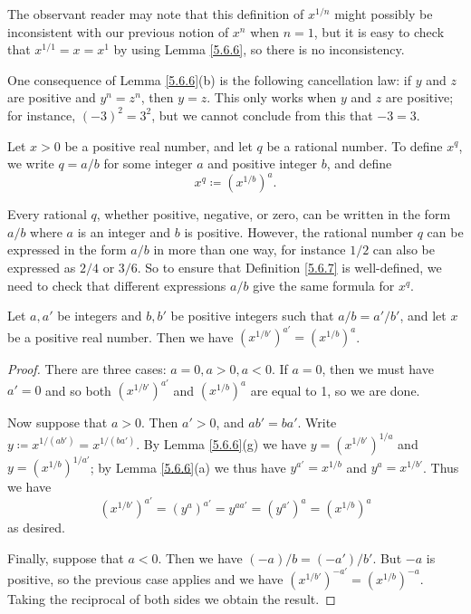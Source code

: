 \begin{note}
    The observant reader may note that this definition of \(x^{1 / n}\) might possibly be inconsistent with our previous notion of \(x^n\) when \(n = 1\), but it is easy to check that \(x^{1 / 1} = x = x^1\) by using Lemma \ref{5.6.6}, so there is no inconsistency.
\end{note}

\begin{note}
    One consequence of Lemma \ref{5.6.6}(b) is the following cancellation law:
    if \(y\) and \(z\) are positive and \(y^n = z^n\), then \(y = z\).
    This only works when \(y\) and \(z\) are positive;
    for instance, \((-3)^2 = 3^2\), but we cannot conclude from this that \(-3 = 3\).
\end{note}

\begin{definition}\label{5.6.7}
    Let \(x > 0\) be a positive real number, and let \(q\) be a rational number.
    To define \(x^q\), we write \(q = a / b\) for some integer \(a\) and positive integer \(b\), and define
    \[
        x^q \coloneqq (x^{1 / b})^a.
    \]
\end{definition}

\begin{note}
    Every rational \(q\), whether positive, negative, or zero, can be written in the form \(a / b\) where \(a\) is an integer and \(b\) is positive.
    However, the rational number \(q\) can be expressed in the form \(a / b\) in more than one way, for instance \(1 / 2\) can also be expressed as \(2 / 4\) or \(3 / 6\).
    So to ensure that Definition \ref{5.6.7} is well-defined, we need to check that different expressions \(a / b\) give the same formula for \(x^q\).
\end{note}

\begin{lemma}\label{5.6.8}
    Let \(a, a'\) be integers and \(b, b'\) be positive integers such that \(a / b = a' / b'\), and let \(x\) be a positive real number.
    Then we have \((x^{1 / b'})^{a'} = (x^{1 / b})^a\).
\end{lemma}

\begin{proof}
    There are three cases: \(a = 0, a > 0, a < 0\).
    If \(a = 0\), then we must have \(a' = 0\) and so both \((x^{1 / b'})^{a'}\) and \((x^{1 / b})^a\) are equal to 1, so we are done.

    Now suppose that \(a > 0\).
    Then \(a' > 0\), and \(ab' = ba'\).
    Write \(y \coloneqq x^{1 / (ab')} = x^{1 / (ba')}\).
    By Lemma \ref{5.6.6}(g) we have \(y = (x^{1 / b'})^{1 / a}\) and \(y = (x^{1 / b})^{1 / a'}\);
    by Lemma \ref{5.6.6}(a) we thus have \(y^{a'} = x^{1 / b}\) and \(y^a = x^{1 / b'}\).
    Thus we have
    \[
        (x^{1 / b'})^{a'} = (y^a)^{a'} = y^{aa'} = (y^{a'})^a = (x^{1 / b})^a
    \]
    as desired.

    Finally, suppose that \(a < 0\).
    Then we have \((-a) / b = (-a') / b'\).
    But \(-a\) is positive, so the previous case applies and we have \((x^{1 / b'})^{-a'} = (x^{1 / b})^{-a}\).
    Taking the reciprocal of both sides we obtain the result.
\end{proof}

